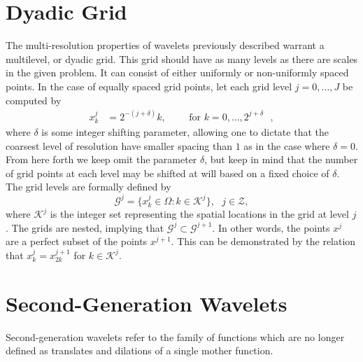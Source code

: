 \documentclass[11pt]{article}
\begin{document}
\section{Dyadic Grid}
The multi-resolution properties of wavelets previously described warrant a multilevel, or dyadic grid.
This grid should have as many levels as there are scales in the given problem. It can consist of 
either uniformly or non-uniformly spaced points. In the case of equally spaced grid points, 
let each grid level $j = 0, \dots, J$ be computed by 
\begin{align}
x^{j}_{k} &= 2^{-(j+\delta)} k,\text{ } \text{ } \text{ }  \text{ for $k=0,\dots,2^{j+\delta}$ },
\end{align}
where $\delta$ is some integer shifting parameter, allowing one to dictate that the coarsest level of resolution have 
smaller spacing than $1$ as in the case where $\delta=0$. From here forth we keep omit the parameter $\delta$, but keep
in mind that the number of grid points at each level may be shifted at will based on a fixed choice of $\delta$. 
The grid levels are formally defined by 
\begin{equation}
    \mathcal{G}^j= \{ x_{k}^{j} \in \Omega : k \in \mathcal{K}^j \}, \text{ } j \in \mathcal{Z},
\end{equation}
where $\mathcal{K}^{j}$ is the integer set representing the spatial locations in the grid at level $j$. The grids are 
nested, implying that $\mathcal{G}^{j} \subset \mathcal{G}^{j+1}$. In other words, the points $x^{j}$ are a perfect 
subset of the points $x^{j+1}$. This can be demonstrated by the relation that 
$x_{k}^{j}=x_{2k}^{j+1}$ for $k \in \mathcal{K}^{j}$.


\section{Second-Generation Wavelets}
Second-generation wavelets refer to the family of functions which are no longer defined as translates and dilations of 
a single mother function. 
\end{document}
